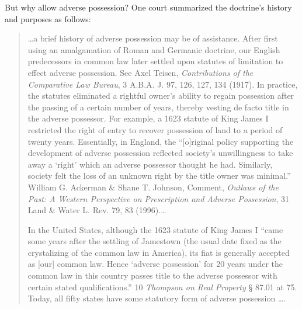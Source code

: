 But why allow adverse possession? One court summarized the doctrine's history
and purposes as follows:
\begin{quotation}
\ldots a brief history of adverse possession may be of assistance. After first
using an amalgamation of Roman and Germanic doctrine, our English predecessors
in common law later settled upon statutes of limitation to effect adverse
possession. See Axel Teisen, \textit{Contributions of the Comparative Law
Bureau}, 3 A.B.A. J. 97, 126, 127, 134 (1917). In practice, the statutes
eliminated a rightful owner's ability to regain possession after the passing of
a certain number of years, thereby vesting de facto title in the adverse
possessor. For example, a 1623 statute of King James I restricted the right of
entry to recover possession of land to a period of twenty years. Essentially,
in England, the ``[o]riginal policy supporting the development of adverse
possession reflected society's unwillingness to take away a `right' which an
adverse possessor thought he had. Similarly, society felt the loss of an
unknown right by the title owner was minimal.'' William G. Ackerman \& Shane T.
Johnson, Comment, \textit{Outlaws of the Past: A Western Perspective on
Prescription and Adverse Possession}, 31 Land \& Water L. Rev. 79, 83
(1996).\ldots

In the United States, although the 1623 statute of King James I ``came some
years after the settling of Jamestown (the usual date fixed as the crystalizing
of the common law in America), its fiat is generally accepted as [our] common
law. Hence `adverse possession' for 20 years under the common law in this
country passes title to the adverse possessor with certain stated
qualifications.'' 10 \textit{Thompson on Real Property} {\S} 87.01 at 75.
Today, all fifty states have some statutory form of adverse possession \ldots.


\end{quotation}
